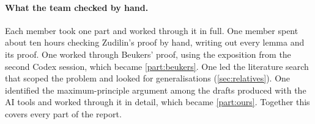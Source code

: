 \documentclass[11pt]{article}
\theoremstyle{plain}
\theoremstyle{definition}
\theoremstyle{remark}
\begin{document}
\paragraph{What the team checked by hand.} Each member took one part and worked through it in full.
One member spent about ten hours checking Zudilin's proof by hand, writing out every lemma and its
proof. One worked through Beukers' proof, using the exposition from the second Codex session, which
became \cref{part:beukers}. One led the
literature search that scoped the problem and looked for generalisations (\cref{sec:relatives}).
One identified the maximum-principle argument among the drafts produced with the AI tools and worked
through it in detail, which became \cref{part:ours}. Together this covers every part of the report.

\end{document}
